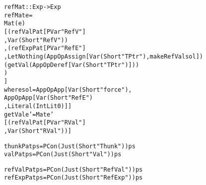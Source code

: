 \begin{alltt}
refMat :: Exp -> Exp
refMat e =
  Mat (e)
  [(refValPat [PVar "RefV"]
   ,Var (Short "RefV"))
  ,(refExpPat [PVar "RefE"]
   ,Let Nothing (App OpAssign [Var (Short "TPtr"), makeRefVal sol])
     (getVal (App OpDeref [Var (Short "TPtr")]))
   )
  ]
  where sol = App OpApp [Var (Short "force"),
                         App OpApp [Var (Short "RefE")
                                   ,Literal (IntLit 0)]]
        getVal e' = Mat e'
                    [(refValPat [PVar "RVal"]
                     ,Var (Short "RVal"))]

thunkPat ps = PCon (Just (Short "Thunk")) ps
valPat   ps = PCon (Just (Short "Val"))   ps

refValPat ps = PCon (Just (Short "RefVal")) ps
refExpPat ps = PCon (Just (Short "RefExp")) ps

\end{alltt}
